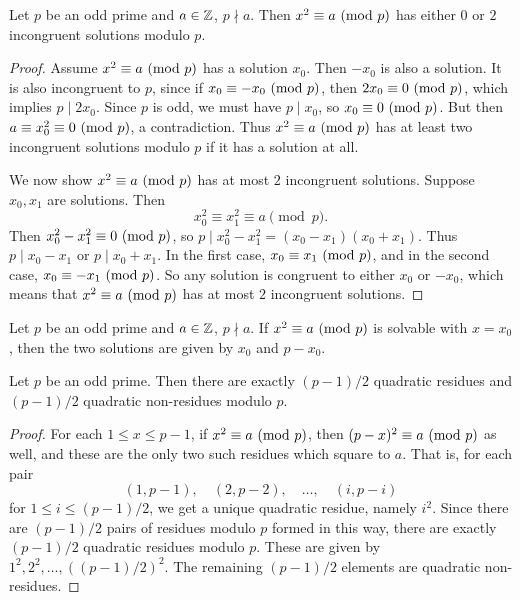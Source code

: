 \begin{prop}
  Let $p$ be an odd prime and
  $a \in \mathbb{Z}$, $p \nmid a$.
  Then $x^2 \equiv a \ (\mathrm{mod}\ p)$ has
  either $0$ or $2$ incongruent
  solutions modulo $p$.
\end{prop}

\begin{proof}
  Assume $x^2 \equiv a \ (\mathrm{mod}\ p)$ has
  a solution $x_0$. Then
  $-x_0$ is also a solution. It
  is also incongruent to $p$, since
  if $x_0 \equiv -x_0 \ (\mathrm{mod}\ p)$,
  then $2x_0 \equiv 0 \ (\mathrm{mod}\ p)$,
  which implies $p \mid 2 x_0$.
  Since $p$ is odd, we must have
  $p \mid x_0$, so
  $x_0 \equiv 0 \ (\mathrm{mod}\ p)$. But then
  $a \equiv x_0^2 \equiv 0 \ (\mathrm{mod}\ p)$,
  a contradiction.
  Thus $x^2 \equiv a \ (\mathrm{mod}\ p)$ has at least
  two incongruent solutions modulo
  $p$ if it has a solution at all.
  
  We now show $x^2 \equiv a \ (\mathrm{mod}\ p)$
  has at most $2$ incongruent solutions.
  Suppose $x_0, x_1$ are
  solutions. Then
  \[
    x_0^2 \equiv x_1^2 \equiv a \pmod{p}.
  \]
  Then $x_0^2 - x_1^2 \equiv 0 \ (\mathrm{mod}\ p)$,
  so $p \mid x_0^2 - x_1^2 = (x_0 - x_1)(x_0 + x_1)$.
  Thus $p \mid x_0 - x_1$ or
  $p \mid x_0 + x_1$. In the first
  case, $x_0 \equiv x_1 \ (\mathrm{mod}\ p)$,
  and in the second case,
  $x_0 \equiv -x_1 \ (\mathrm{mod}\ p)$. So any
  solution is congruent to either
  $x_0$ or $-x_0$, which means
  that $x^2 \equiv a \ (\mathrm{mod}\ p)$
  has at most $2$ incongruent
  solutions.
\end{proof}

\begin{corollary}
  Let $p$ be an odd prime and
  $a \in \mathbb{Z}$, $p \nmid a$.
  If $x^2 \equiv a \ (\mathrm{mod}\ p)$ is
  solvable with $x = x_0$, then
  the two solutions are given by
  $x_0$ and $p - x_0$.
\end{corollary}

\begin{prop}\label{prop:quadratic-residues-count}
  Let $p$ be an odd prime. Then there
  are exactly $(p - 1) / 2$ quadratic
  residues and $(p - 1) / 2$ quadratic
  non-residues modulo $p$.
\end{prop}

\begin{proof}
  For each $1 \le x \le p - 1$, if
  $x^2 \equiv a \ (\mathrm{mod}\ p)$, then
  $(p - x)^2 \equiv a \ (\mathrm{mod}\ p)$ as well,
  and these are the only two such
  residues which square to $a$.
  That is, for each pair
  \[
    (1, p - 1), \quad (2, p - 2), \quad
    \dots, \quad (i, p - i)
  \]
  for $1 \le i \le (p - 1) / 2$,
  we get a unique quadratic residue,
  namely $i^2$. Since there are
  $(p - 1) / 2$ pairs of residues
  modulo $p$ formed in this way,
  there are exactly $(p - 1) / 2$
  quadratic residues modulo $p$.
  These are given by
  $1^2, 2^2, \dots, ((p - 1) / 2)^2$.
  The remaining $(p - 1) / 2$
  elements are quadratic
  non-residues.
\end{proof}

